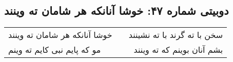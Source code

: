 \begin{center}
\section*{دوبیتی شماره ۴۷: خوشا آنانکه هر شامان ته وینند}
\label{sec:047}
\begin{longtable}{l p{0.5cm} r}
خوشا آنانکه هر شامان ته وینند
&&
سخن با ته گرند با ته نشینند
\\
مو که پایم نبی کایم ته وینم
&&
بشم آنان بوینم که ته وینند
\\
\end{longtable}
\end{center}
